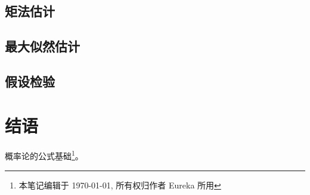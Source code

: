 \subsection{矩法估计}

\subsection{最大似然估计}

\subsection{假设检验}

\section{结语}
概率论的公式基础\footnote[1]{本笔记编辑于 \today, 所有权归作者 Eureka 所用}。